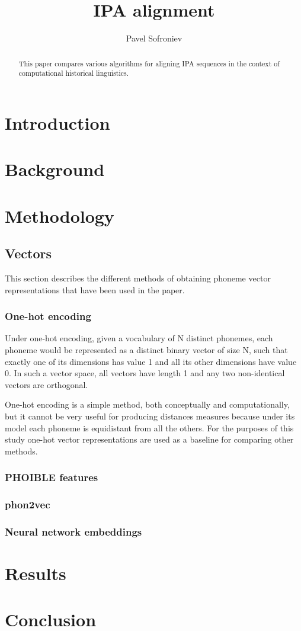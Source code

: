 \documentclass[a4paper]{report}
\begin{document}
\title{IPA alignment}
\author{Pavel Sofroniev}
\maketitle

\begin{abstract}
	This paper compares various algorithms for aligning IPA sequences in the context of computational historical linguistics.
\end{abstract}


\chapter{Introduction}


\chapter{Background}


\chapter{Methodology}

\section{Vectors}

This section describes the different methods of obtaining phoneme vector representations that have been used in the paper.

\subsection{One-hot encoding}

Under one-hot encoding, given a vocabulary of N distinct phonemes, each phoneme would be represented as a distinct binary vector of size N,
such that exactly one of its dimensions has value 1 and all its other dimensions have value 0.
In such a vector space, all vectors have length 1 and any two non-identical vectors are orthogonal.

One-hot encoding is a simple method, both conceptually and computationally, but it cannot be very useful for producing distances measures
because under its model each phoneme is equidistant from all the others.
For the purposes of this study one-hot vector representations are used as a baseline for comparing other methods.


\subsection{PHOIBLE features}


\subsection{phon2vec}


\subsection{Neural network embeddings}


\chapter{Results}


\chapter{Conclusion}
\end{document}
